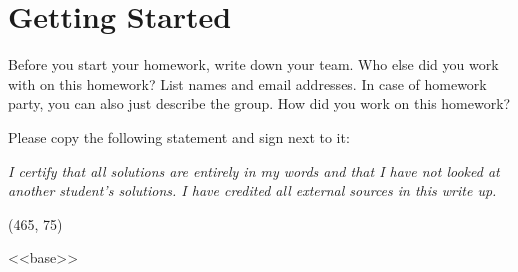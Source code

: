 \documentclass[11pt]{article}
\begin{document}
\maketitle
\fontsize{12}{15}\selectfont

\renewenvironment{solution}{}{}

\section{Getting Started}
Before you start your homework, write down your team. Who else did you work with on this homework? List names and email addresses. In case of homework party, you can also just describe the group. How did you work on this homework?

Please copy the following statement and sign next to it:

\textit{I certify that all solutions are entirely in my words and that I have not looked at another student's solutions. I have credited all external sources in this write up.}

\vspace{15pt}
\framebox(465, 75){}

<<base>>
\end{document}
